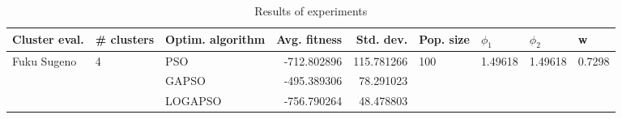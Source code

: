 \begin{table}
\centering
\caption{Results of experiments}
\begin{tabular}{lllrrllll}
\toprule
               Cluster eval. &        \# clusters & Optim. algorithm &  Avg. fitness &  Std. dev. &            Pop. size &               $\phi_{1}$ &               $\phi_{2}$ &                       w \\
\midrule
\multirow{3}{*}{Fuku Sugeno} & \multirow{3}{*}{4} &              PSO &   -712.802896 & 115.781266 & \multirow{3}{*}{100} & \multirow{3}{*}{1.49618} & \multirow{3}{*}{1.49618} & \multirow{3}{*}{0.7298} \\
                             &                    &            GAPSO &   -495.389306 &  78.291023 &                      &                          &                          &                         \\
                             &                    &          LOGAPSO &   -756.790264 &  48.478803 &                      &                          &                          &                         \\
\bottomrule
\end{tabular}
\end{table}
